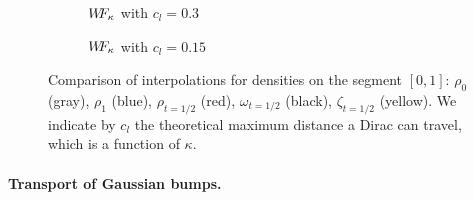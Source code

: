 \begin{figure}[hbt]
\begin{subfigure}{0.5\linewidth} 
\centering
\caption{$W\! \! F_{\kappa}$ with $c_l =0.3$}
\label{subWF1}
\end{subfigure}%
%
\begin{subfigure}{0.5\linewidth} 
\centering
\caption{$W\! \! F_{\kappa}$ with $c_l = 0.15$}
\label{subWF2}
\end{subfigure}
\caption{Comparison of interpolations for densities on the segment $[0,1]$:  $\rho_0$ (gray),  $\rho_1$ (blue),  $\rho_{t=1/2}$  (red), $\omega_{t=1/2}$ (black),  $\zeta_{t=1/2}$ (yellow). We indicate by $c_l$ the theoretical maximum distance a Dirac can travel, which is a function of $\kappa$.}
\label{fig:gaussians}
\end{figure}

\paragraph{Transport of Gaussian bumps.}

